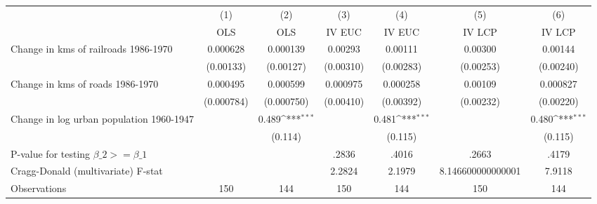 {
\def\sym#1{\ifmmode^{#1}\else\(^{#1}\)\fi}
\begin{tabular}{l*{6}{c}}
\hline\hline
                &\multicolumn{1}{c}{(1)}&\multicolumn{1}{c}{(2)}&\multicolumn{1}{c}{(3)}&\multicolumn{1}{c}{(4)}&\multicolumn{1}{c}{(5)}&\multicolumn{1}{c}{(6)}\\
                &\multicolumn{1}{c}{OLS}&\multicolumn{1}{c}{OLS}&\multicolumn{1}{c}{IV EUC}&\multicolumn{1}{c}{IV EUC}&\multicolumn{1}{c}{IV LCP}&\multicolumn{1}{c}{IV LCP}\\
\hline
Change in kms of railroads 1986-1970& 0.000628         & 0.000139         &  0.00293         &  0.00111         &  0.00300         &  0.00144         \\
                &(0.00133)         &(0.00127)         &(0.00310)         &(0.00283)         &(0.00253)         &(0.00240)         \\
[1em]
Change in kms of roads 1986-1970& 0.000495         & 0.000599         & 0.000975         & 0.000258         &  0.00109         & 0.000827         \\
                &(0.000784)         &(0.000750)         &(0.00410)         &(0.00392)         &(0.00232)         &(0.00220)         \\
[1em]
Change in log urban population 1960-1947&                  &    0.489\sym{***}&                  &    0.481\sym{***}&                  &    0.480\sym{***}\\
                &                  &  (0.114)         &                  &  (0.115)         &                  &  (0.115)         \\
\hline
P-value for testing $\beta\_{2} >= \beta\_{1}$&                  &                  &    .2836         &    .4016         &    .2663         &    .4179         \\
Cragg-Donald (multivariate) F-stat&                  &                  &   2.2824         &   2.1979         &8.146600000000001         &   7.9118         \\
Observations    &      150         &      144         &      150         &      144         &      150         &      144         \\
\hline\hline
\end{tabular}
}
